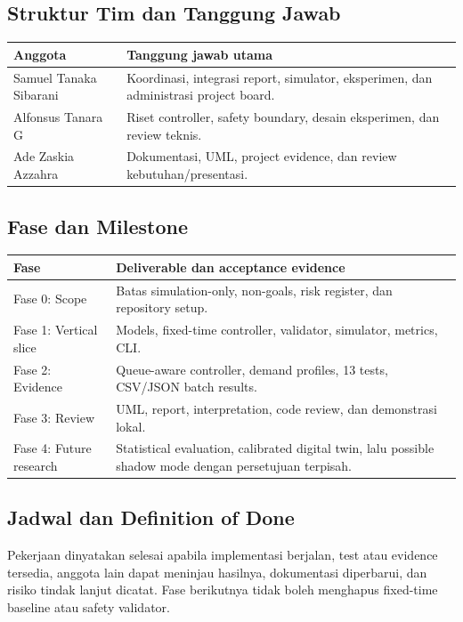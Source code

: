 \documentclass[12pt]{article}
\begin{document}
\subsection{Struktur Tim dan Tanggung Jawab}
\begin{longtable}{p{} p{}}
\toprule
\textbf{Anggota} & \textbf{Tanggung jawab utama}\\
\midrule
Samuel Tanaka Sibarani & Koordinasi, integrasi report, simulator, eksperimen, dan administrasi project board.\\
Alfonsus Tanara G & Riset controller, safety boundary, desain eksperimen, dan review teknis.\\
Ade Zaskia Azzahra & Dokumentasi, UML, project evidence, dan review kebutuhan/presentasi.\\
\bottomrule
\end{longtable}

\subsection{Fase dan Milestone}
\begin{longtable}{p{} p{}}
\toprule
\textbf{Fase} & \textbf{Deliverable dan acceptance evidence}\\
\midrule
Fase 0: Scope & Batas simulation-only, non-goals, risk register, dan repository setup.\\
Fase 1: Vertical slice & Models, fixed-time controller, validator, simulator, metrics, CLI.\\
Fase 2: Evidence & Queue-aware controller, demand profiles, 13 tests, CSV/JSON batch results.\\
Fase 3: Review & UML, report, interpretation, code review, dan demonstrasi lokal.\\
Fase 4: Future research & Statistical evaluation, calibrated digital twin, lalu possible shadow mode dengan persetujuan terpisah.\\
\bottomrule
\end{longtable}

\subsection{Jadwal dan Definition of Done}
Pekerjaan dinyatakan selesai apabila implementasi berjalan, test atau evidence tersedia, anggota lain dapat meninjau hasilnya, dokumentasi diperbarui, dan risiko tindak lanjut dicatat. Fase berikutnya tidak boleh menghapus fixed-time baseline atau safety validator.
\end{document}
